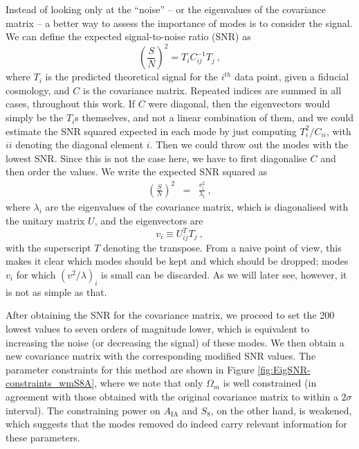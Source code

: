 \documentclass[twocolumn,nofootinbib]{\docclass}
\newcommand{\rf}[1]{Figure \ref{fig:#1}}
\newcommand\be{\begin{equation}}
\newcommand\ee{\end{equation}}
\def\bea{\begin{eqnarray}}
\def\eea{\end{eqnarray}}
\begin{document}
	Instead of looking only at the ``noise'' -- or the eigenvalues of the covariance matrix -- a better way to assess the importance of modes is to consider the signal. We can define the expected signal-to-noise ratio (SNR) as
	\be
	\left(\frac{S}{N}\right)^2 = T_i C^{-1}_{ij} T_j\
	,\ee
	where $T_i$ is the predicted theoretical signal for the $i^{th}$ data point, given a fiducial cosmology, and $C$ is the covariance matrix. Repeated indices are summed in all cases, throughout this work. If $C$ were diagonal, then the eigenvectors would simply be the $T_i$s themselves, and not a linear combination of them, and we could estimate the SNR squared expected in each mode by just computing $T_i^2/C_{ii}$, with $ii$ denoting the diagonal element $i$. Then we could throw out the modes with the lowest SNR. Since this is not the case here, we have to first diagonalise $C$ and then order the values. We write the expected SNR squared as
	\bea
	\left(\frac{S}{N}\right)^2
	&=& \frac{v_i^2}{\lambda_i}\
	,\eea
	where $\lambda_i$ are the eigenvalues of the covariance matrix, which is diagonalised with the unitary matrix $U$, and the eigenvectors are 
	\be
	v_i\equiv U_{ij}^T T_j\
	,\ee
	with the superscript $T$ denoting the transpose. From a naive point of view, this makes it clear which modes should be kept and which should be dropped; modes $v_i$ for which $\left(v^2/\lambda\right)_i$ is small can be discarded. As we will later see, however, it is not as simple as that.
	
	After obtaining the SNR for the covariance matrix, we proceed to set the 200 lowest values to seven orders of magnitude lower, which is equivalent to increasing the noise (or decreasing the signal) of these modes. We then obtain a new covariance matrix with the corresponding modified SNR values. 
	The parameter constraints for this method are shown in \rf{EigSNR-constraints_wmS8A}, where we note that only $\Omega_m$ is well constrained (in agreement with those obtained with the original covariance matrix to within a $2\sigma$ interval). The constraining power on $A_{\mathrm{IA}}$ and $S_8$, on the other hand, is weakened, which suggests that the modes removed do indeed carry relevant information for these parameters.
	
\end{document}
